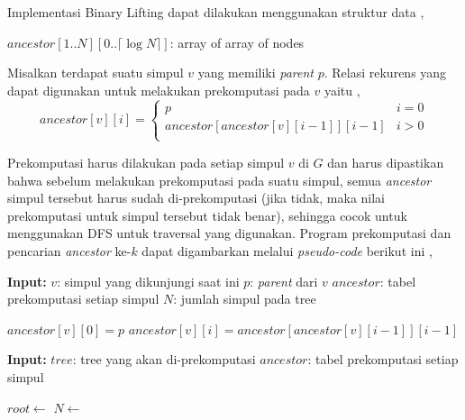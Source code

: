 \documentclass[12pt,a4paper]{article}
\begin{document}
Implementasi Binary Lifting dapat dilakukan menggunakan struktur data \cite{cp-cses-book},
\begin{center}
    $ancestor[1..N][0..\lceil \log N \rceil]$: array of array of nodes
\end{center}

Misalkan terdapat suatu simpul $v$ yang memiliki \textit{parent} $p$. Relasi rekurens yang dapat digunakan untuk melakukan prekomputasi pada $v$ yaitu \cite{cp-binlift},
\[ 
ancestor[v][i] = 
\begin{cases} 
    p & i = 0 \\
    ancestor[ancestor[v][i-1]][i-1] & i > 0 \\
\end{cases}
\]

Prekomputasi harus dilakukan pada setiap simpul $v$ di $G$ dan 
harus dipastikan bahwa sebelum melakukan prekomputasi pada suatu simpul, semua \textit{ancestor} simpul tersebut harus sudah di-prekomputasi (jika tidak, maka nilai prekomputasi untuk simpul tersebut tidak benar),
sehingga cocok untuk menggunakan DFS untuk traversal yang digunakan.
Program prekomputasi dan pencarian \textit{ancestor} ke-$k$ dapat digambarkan melalui \textit{pseudo-code} berikut ini \cite{cp-binlift} \cite{cp-cses-book},

\begin{algorithm}[H]
    \caption{Prekomputasi pada Binary Lifting} \label{alg:binlift-precompute}
    \begin{algorithmic}
            \State \textbf{Input:} \; $v$: simpul yang dikunjungi saat ini
            \State \qquad \qquad $p$: \textit{parent} dari $v$
            \State \qquad \qquad $ancestor$: tabel prekomputasi setiap simpul
            \State \qquad \qquad $N$: jumlah simpul pada tree
            \Statex
        
            \State $ancestor[v][0] = p$
                \State $ancestor[v][i] = ancestor[ancestor[v][i-1]][i-1]$
            \EndFor
            
            \Statex

                    \State {} 
                \EndIf
            \EndFor

        \EndProcedure

        \Statex

            \State \textbf{Input:} \; $tree$: tree yang akan di-prekomputasi
            \State \qquad \qquad $ancestor$: tabel prekomputasi setiap simpul
            \Statex

            \State $root \gets $ 
            \State $N \gets $ 
            \State {}
        \EndProcedure
    \end{algorithmic}
\end{algorithm}
\end{document}

